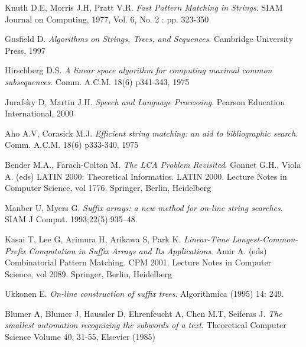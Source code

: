 
\begin{thebibliography}{}

 Knuth D.E, Morris J.H, Pratt V.R. \textit{Fast Pattern Matching in Strings}. SIAM Journal on Computing, 1977, Vol. 6, No. 2 : pp. 323-350

 Gusfield D. \textit{Algorithms on Strings, Trees, and Sequences}. Cambridge University Press, 1997

 Hirschberg D.S. \textit{A linear space algorithm for computing maximal common subsequences}. Comm. A.C.M. 18(6) p341-343, 1975

 Jurafsky D, Martin J.H. \textit{Speech and Language Processing}. Pearson Education International, 2000

 Aho A.V, Corasick M.J. \textit{Efficient string matching: an aid to bibliographic search}. Comm. A.C.M. 18(6) p333-340, 1975

 Bender M.A., Farach-Colton M. \textit{The LCA Problem Revisited}. Gonnet G.H., Viola A. (eds) LATIN 2000: Theoretical Informatics. LATIN 2000. Lecture Notes in Computer Science, vol 1776. Springer, Berlin, Heidelberg

 Manber U, Myers G. \textit{Suffix arrays: a new method for on-line string searches}. SIAM J Comput. 1993;22(5):935--48.

 Kasai T, Lee G, Arimura H, Arikawa S, Park K. \textit{Linear-Time Longest-Common-Prefix Computation in Suffix Arrays and Its Applications}. Amir A. (eds) Combinatorial Pattern Matching. CPM 2001. Lecture Notes in Computer Science, vol 2089. Springer, Berlin, Heidelberg

 Ukkonen E. \textit{On-line construction of suffix trees}. Algorithmica (1995) 14: 249. 

 Blumer A, Blumer J, Haussler D, Ehrenfeucht A, Chen M.T, Seiferas J. \textit{The smallest automation recognizing the subwords of a text}. Theoretical Computer Science
Volume 40, 31-55, Elsevier (1985)


\end{thebibliography}
